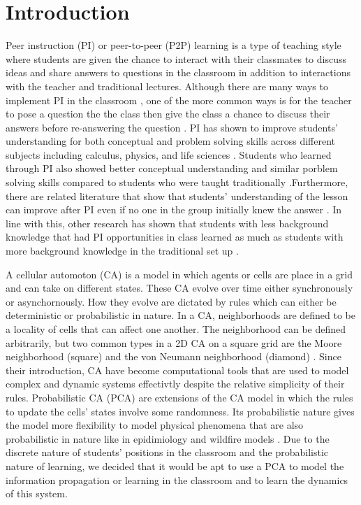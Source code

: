 \documentclass[10pt,a4paper,twoside]{article}
\begin{document}
\section{Introduction}\label{sec:intro}
Peer instruction (PI) or peer-to-peer (P2P) learning is a type of teaching style where students are given the chance to interact with their classmates to discuss ideas and share answers to questions in the classroom in addition to interactions with the teacher and traditional lectures. Although there are many ways to implement PI in the classroom \cite{knight2018peer}, one of the more common ways is for the teacher to pose a question the the class then give the class a chance to discuss their answers before re-answering the question \cite{crouch2001peer}. PI has shown to improve students' understanding for both conceptual and problem solving skills across different subjects including calculus, physics, and life sciences \cite{crouch2001peer} \cite{smith2009peer}. Students who learned through PI also showed better conceptual understanding and similar porblem solving skills compared to students who were taught traditionally \cite{lasry2008peer}.Furthermore, there are related literature that show that students' understanding of the lesson can improve after PI even if no one in the group initially knew the answer \cite{smith2009peer}. In line with this, other research has shown that students with less background knowledge that had PI opportunities in class learned as much as students with more background knowledge in the traditional set up \cite{lasry2008peer}.

\noindent A cellular automoton (CA) is a model in which agents or cells are place in a grid and can take on different states. These CA evolve over time either synchronously or asynchornously. How they evolve are dictated by rules which can either be deterministic or probabilistic in nature. In a CA, neighborhoods are defined to be a locality of cells that can affect one another. The neighborhood can be defined arbitrarily, but two common types in a 2D CA on a square grid are the Moore neighborhood (square) and the von Neumann neighborhood (diamond) \cite{weisstein2002cellular}. Since their introduction, CA have become computational tools that are used to model complex and dynamic systems effectivtly despite the relative simplicity of their rules. Probabilistic CA (PCA) are extensions of the CA model in which the rules to update the cells' states involve some randomness. Its probabilistic nature gives the model more flexibility to model physical phenomena that are also probabilistic in nature like in epidimiology and wildfire models \cite{louis2018probabilistic}. Due to the discrete nature of students' positions in the classroom and the probabilistic nature of learning, we decided that it would be apt to use a PCA to model the information propagation or learning in the classroom and to learn the dynamics of this system.
\end{document}
